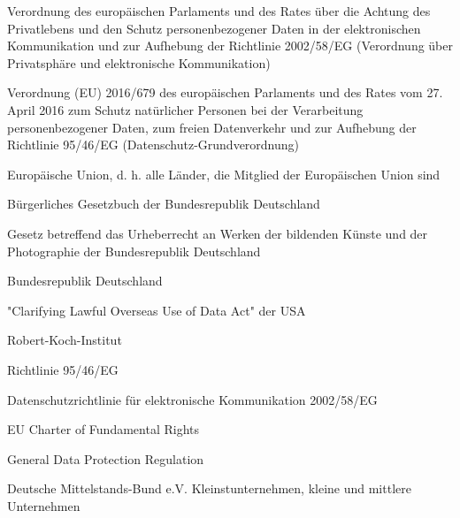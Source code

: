 {
    Verordnung des europäischen Parlaments und des Rates über die Achtung des
Privatlebens und den Schutz personenbezogener Daten in der elektronischen
Kommunikation und zur Aufhebung der Richtlinie 2002/58/EG (Verordnung über
Privatsphäre und elektronische Kommunikation)
}

{
    Verordnung (EU) 2016/679 des europäischen Parlaments und des Rates vom 27. April 2016 zum Schutz natürlicher Personen bei der Verarbeitung personenbezogener Daten, zum freien Datenverkehr und zur Aufhebung der Richtlinie 95/46/EG (Datenschutz-Grundverordnung)
}

{  
    Europäische Union, d. h. alle Länder, die Mitglied der Europäischen Union sind
}

{
    Bürgerliches Gesetzbuch der Bundesrepublik Deutschland
}

{
    Gesetz betreffend das Urheberrecht an Werken der bildenden Künste und der Photographie der Bundesrepublik Deutschland
}

{
    Bundesrepublik Deutschland
}

{
    "Clarifying Lawful Overseas Use of Data Act" der USA
}

{
    Robert-Koch-Institut
}

{
    Richtlinie 95/46/EG
}

{
    Datenschutzrichtlinie für elektronische Kommunikation 2002/58/EG
}

{
    EU Charter of Fundamental Rights
}

{
    General Data Protection Regulation
}

{
    Deutsche Mittelstands-Bund e.V.
}
{
    Kleinstunternehmen, kleine und mittlere Unternehmen
}

\pagebreak
